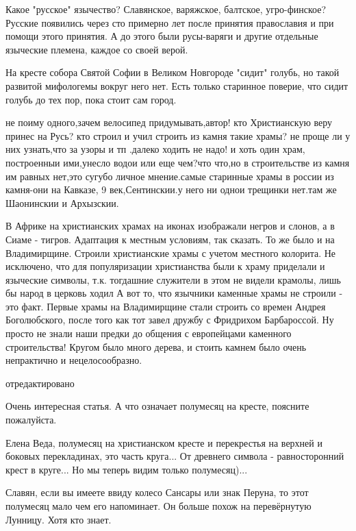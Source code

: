 \begin{itemize}
Какое "русское" язычество? Славянское, варяжское, балтское, угро-финское?
Русские появились через сто примерно лет после принятия православия и при
помощи этого принятия. А до этого были русы-варяги и другие отдельные языческие
племена, каждое со своей верой.


На кресте собора Святой Софии в Великом Новгороде "сидит" голубь, но такой
развитой мифологемы вокруг него нет. Есть только старинное поверие, что сидит
голубь до тех пор, пока стоит сам город.


не поиму одного,зачем велосипед придумывать,автор! кто Христианскую веру принес
на Русь? кто строил и учил строить из камня такие храмы? не проще ли у них
узнать,что за узоры и тп .далеко ходить не надо! и хоть один храм, построенныи
ими,унесло водои или еще чем?что что,но в строительстве из камня им равных
нет,это сугубо личное мнение.самые старинные храмы в россии из камня-они на
Кавказе, 9 век,Сентинскии.у него ни однои трещинки нет.там же Шаонинскии и
Архызскии.


В Африке на христианских храмах на иконах изображали негров и слонов, а в Сиаме
- тигров. Адаптация к местным условиям, так сказать. То же было и на
Владимирщине. Строили христианские храмы с учетом местного колорита. Не
исключено, что для популяризации христианства были к храму приделали и
языческие символы, т.к. тогдашние служители в этом не видели крамолы, лишь бы
народ в церковь ходил А вот то, что язычники каменные храмы не строили - это
факт. Первые храмы на Владимирщине стали строить со времен Андрея Боголюбского,
после того как тот завел дружбу с Фридрихом Барбароссой. Ну просто не знали
наши предки до общения с европейцами каменного строительства! Кругом было много
дерева, и стоить камнем было очень непрактично и нецелосообразно.

отредактировано

Очень интересная статья. А что означает полумесяц на кресте, поясните
пожалуйста.


Елена Веда, полумесяц на христианском кресте и перекрестья на верхней и боковых
перекладинах, это часть круга... От древнего символа - равносторонний крест в
круге... Но мы теперь видим только полумесяц)...


Славян, если вы имеете ввиду колесо Сансары или знак Перуна, то этот полумесяц
мало чем его напоминает. Он больше похож на перевёрнутую Лунницу. Хотя кто
знает.


\end{itemize}
